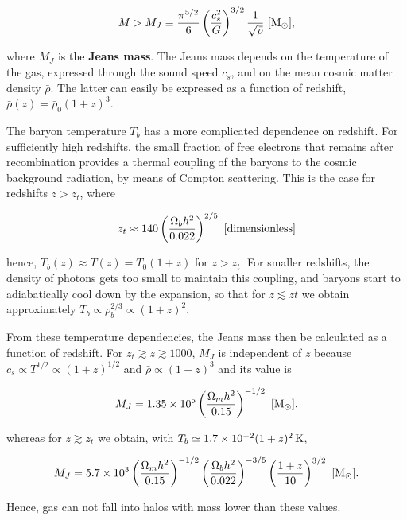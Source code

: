\documentclass[a4paper,11pt]{article}
\begin{document}
\begin{align*}
    M > M_J \equiv \frac{\pi^{5/2}}{6}\left(\frac{c_s^2}{G}\right)^{3/2}\frac{1}{\sqrt{\bar{\rho}}} ~ [{\rm M_\odot}],
\end{align*}

{\noindent}where $M_J$ is the \textbf{Jeans mass}. The Jeans mass depends on the temperature of the gas, expressed through the sound speed $c_s$, and on the mean cosmic matter density $\bar{\rho}$. The latter can easily be expressed as a function of redshift, $\bar{\rho}(z) = \bar{\rho}_0(1+z)^3$.

{\noindent}The baryon temperature $T_b$ has a more complicated dependence on redshift. For sufficiently high redshifts, the small fraction of free electrons that remains after recombination provides a thermal coupling of the baryons to the cosmic background radiation, by means of Compton scattering. This is the case for redshifts $z>z_t$, where

\begin{align*}
    z_t \approx 140\left(\frac{\Omega_bh^2}{0.022}\right)^{2/5} ~ [{\rm dimensionless}]
\end{align*}

{\noindent}hence, $T_b(z)\approx T(z)=T_0(1+z)$ for $z>z_t$. For smaller redshifts, the density of photons gets too small to maintain this coupling, and baryons start to adiabatically cool down by the expansion, so that for $z\lesssim zt$ we obtain approximately $T_b\propto\rho_b^{2/3}\propto(1+z)^2$.

{\noindent}From these temperature dependencies, the Jeans mass then be calculated as a function of redshift. For $z_t\gtrsim z\gtrsim 1000$, $M_J$ is independent of $z$ because $c_s
\propto T^{1/2}\propto(1+z)^{1/2}$ and $\bar{\rho}\propto(1+z)^3$ and its value is

\begin{align*}
    M_J = 1.35\times10^5 \left(\frac{\Omega_mh^2}{0.15}\right)^{-1/2} ~ [{\rm M_\odot}],
\end{align*}

{\noindent}whereas for $z\gtrsim z_t$ we obtain, with $T_b\simeq1.7\times10^{-2}(1+z)^2\,{\rm K}$,

\begin{align*}
    M_J = 5.7\times10^3 \left(\frac{\Omega_mh^2}{0.15}\right)^{-1/2} \left(\frac{\Omega_bh^2}{0.022}\right)^{-3/5}\left(\frac{1+z}{10}\right)^{3/2} ~ [{\rm M_\odot}].
\end{align*}

{\noindent}Hence, gas can not fall into halos with mass lower than these values.
\end{document}
